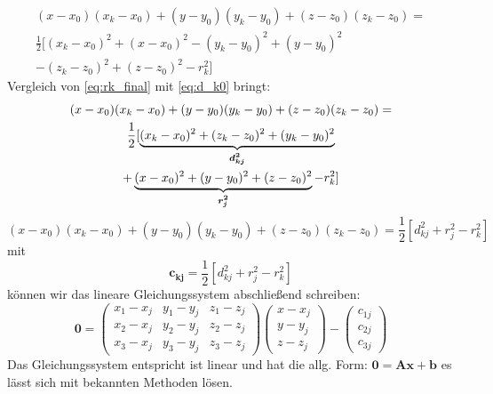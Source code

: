 %
\begin{multline}\label{eq:rk_final}
(x-x_0)(x_k-x_0)+(y-y_0)(y_k-y_0)+(z-z_0)(z_k-z_0)= \\\frac{1}{2}[(x_k-x_0)^2+(x-x_0)^2-(y_k-y_0)^2+(y-y_0)^2
\\-(z_k-z_0)^2 +(z-z_0)^2-r_k^2]
\end{multline}
%
Vergleich von \eqref{eq:rk_final} mit \eqref{eq:d_k0} bringt: 
%
\begin{multline}
(x-x_0)(x_k-x_0)+(y-y_0)(y_k-y_0)+(z-z_0)(z_k-z_0)= \\\frac{1}{2}[\underbrace{(x_k-x_0)^2+(z_k-z_0)^2+(y_k-y_0)^2}_\text{\boldmath{$d_{kj}^2$}}
\\+\underbrace{(x-x_0)^2+(y-y_0)^2 +(z-z_0)^2}_\text{\boldmath{$r_j^2$}}-r_k^2]
\end{multline}
%
\begin{equation}
(x-x_0)(x_k-x_0)+(y-y_0)(y_k-y_0)+(z-z_0)(z_k-z_0)=\frac{1}{2}[d_{kj}^2+r_{j}^2-r_k^2]\label{eq:rk_final_simplyfied}
\end{equation}
mit 
\begin{equation}\label{eq:c_kj}
\mathbf{c_{kj}}=\frac{1}{2}[d_{kj}^2+r_{j}^2-r_k^2]
\end{equation}
können wir das lineare Gleichungssystem abschließend schreiben:
%
\begin{equation}
\mathbf{0}=
\left(
	\begin{array}{ccc}
		x_1-x_j & y_1-y_j & z_1-z_j \\
		x_2-x_j & y_2-y_j & z_2-z_j \\
		x_3-x_j & y_3-y_j & z_3-z_j
	\end{array}
\right)
\left(
   \begin{array}{c}
	   x-x_j\\
	   y-y_j\\
	   z-z_j
   \end{array}
\right)
-
\left(
	\begin{array}{c}
		c_{1j}\\
		c_{2j}\\
		c_{3j}
	\end{array}
\right)
\end{equation}
%
Das Gleichungssystem entspricht ist linear und hat die allg. Form: $\mathbf{0} = \mathbf{Ax}+\mathbf{b}$ es lässt sich mit bekannten Methoden lösen.



